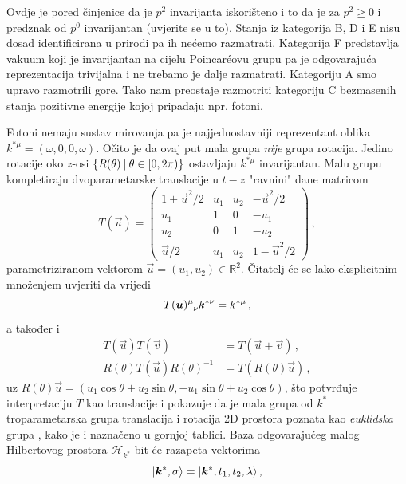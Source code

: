 Ovdje je pored činjenice da je $p^2$ invarijanta iskorišteno i to da je
za $p^2 \ge 0$ i predznak od $p^0$ invarijantan (uvjerite se u to).
Stanja iz kategorija B, D i E nisu dosad identificirana u prirodi pa ih
nećemo razmatrati.
Kategorija F predstavlja vakuum koji je invarijantan na cijelu Poincar\'{e}ovu
grupu pa je odgovarajuća reprezentacija trivijalna i ne trebamo je
dalje razmatrati.
Kategoriju A smo upravo razmotrili gore.
Tako nam preostaje razmotriti kategoriju C bezmasenih stanja pozitivne
energije kojoj pripadaju npr. fotoni.

Fotoni nemaju sustav mirovanja pa je najjednostavniji reprezentant
oblika $k^{*\mu} = (\omega, 0, 0, \omega)$. Očito je da ovaj put
mala grupa \emph{nije} grupa rotacija. Jedino rotacije oko $z$-osi
$\{R(\theta) \: | \: \theta \in [0, 2\pi)\}$ ostavljaju $k^{*\mu}$
invarijantan. Malu grupu kompletiraju dvoparametarske translacije
u $t-z$ "ravnini" dane matricom
\begin{equation}
  T(\vec{u}) = \begin{pmatrix}
      1+\vec{u}^2/2 & u_1 & u_2 & -\vec{u}^2/2 \\
u_1 & 1 & 0 & -u_1 \\
u_2 & 0 & 1 & -u_2 \\
\vec{u}/2 & u_1 & u_2 & 1-\vec{u}^2/2
  \end{pmatrix} \,,
    \label{eq:defTu}
\end{equation}
parametriziranom vektorom $\vec{u} = (u_1, u_2) \in \mathbb{R}^2$.
Čitatelj će se lako eksplicitnim množenjem uvjeriti da vrijedi
\begin{equation}
    \tensor{T(\vec{u})}{^{\mu}_{\nu}} k^{*\nu} = k^{*\mu} \,,
\end{equation}
a također i
\begin{align}
    T(\vec{u}) T(\vec{v}) &= T(\vec{u} + \vec{v}) \,, \\
    R(\theta) T(\vec{u}) R(\theta)^{-1} &= T(R(\theta)\vec{u}) \,,
\end{align}
uz $R(\theta)\vec{u} = (u_1\cos\theta + u_2 \sin\theta, -u_1\sin\theta+u_2\cos\theta)$,
što potvrđuje interpretaciju $T$ kao translacije i pokazuje da je mala grupa
od $k^{*}$ troparametarska grupa translacija i rotacija 2D prostora poznata
kao \emph{euklidska} grupa , kako je i naznačeno u gornjoj tablici.
Baza odgovarajućeg malog Hilbertovog prostora $\mathcal{H}_{k^*}$ bit
će razapeta vektorima
\begin{equation}
  \ket{\vec{k}^{*}, \sigma} = \ket{\vec{k}^{*}, t_1, t_{2}, \lambda} \,,
\end{equation}
